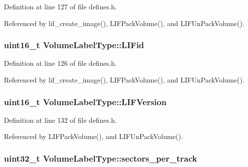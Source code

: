 Definition at line 127 of file defines.\+h.



Referenced by lif\+\_\+create\+\_\+image(), L\+I\+F\+Pack\+Volume(), and L\+I\+F\+Un\+Pack\+Volume().

\subsubsection[{\texorpdfstring{L\+I\+Fid}{LIFid}}]{\setlength{\rightskip}{0pt plus 5cm}uint16\+\_\+t Volume\+Label\+Type\+::\+L\+I\+Fid}\hypertarget{structVolumeLabelType_a16bdde2d19114ac3238477c29fe75b4a}{}\label{structVolumeLabelType_a16bdde2d19114ac3238477c29fe75b4a}


Definition at line 126 of file defines.\+h.



Referenced by lif\+\_\+create\+\_\+image(), L\+I\+F\+Pack\+Volume(), and L\+I\+F\+Un\+Pack\+Volume().

\subsubsection[{\texorpdfstring{L\+I\+F\+Version}{LIFVersion}}]{\setlength{\rightskip}{0pt plus 5cm}uint16\+\_\+t Volume\+Label\+Type\+::\+L\+I\+F\+Version}\hypertarget{structVolumeLabelType_a62003e63b2feeedb809d681e0fc4f1cc}{}\label{structVolumeLabelType_a62003e63b2feeedb809d681e0fc4f1cc}


Definition at line 132 of file defines.\+h.



Referenced by L\+I\+F\+Pack\+Volume(), and L\+I\+F\+Un\+Pack\+Volume().

\subsubsection[{\texorpdfstring{sectors\+\_\+per\+\_\+track}{sectors_per_track}}]{\setlength{\rightskip}{0pt plus 5cm}uint32\+\_\+t Volume\+Label\+Type\+::sectors\+\_\+per\+\_\+track}\hypertarget{structVolumeLabelType_a0014a4795dfcf4117212bba590fc889e}{}\label{structVolumeLabelType_a0014a4795dfcf4117212bba590fc889e}


